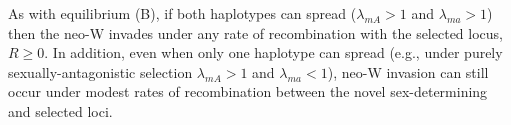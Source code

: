 \documentclass[12pt]{article}
\begin{document}
As with equilibrium (B), if both haplotypes can spread ($\lambda_{mA}>1$ and $\lambda_{ma}>1$) then the neo-W invades under any rate of recombination with the selected locus, $R\geq0$. 
In addition, even when only one haplotype can spread (e.g., under purely sexually-antagonistic selection $\lambda_{mA}>1$ and $\lambda_{ma}<1$), neo-W invasion can still occur under modest rates of recombination between the novel sex-determining and selected loci.


\end{document}
